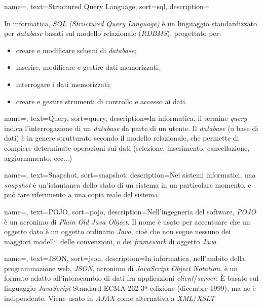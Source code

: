{
    name=,
    text=Structured Query Language,
    sort=sql,
    description={In informatica, \textit{SQL (Structured Query Language)} è un linguaggio standardizzato per \textit{database} basati sul modello relazionale (\textit{RDBMS}), progettato per:
    \begin{itemize}
    	\item{creare e modificare schemi di \textit{database};}
    	\item{inserire, modificare e gestire dati memorizzati;}
    	\item{interrogare i dati memorizzati;}
    	\item{creare e gestire strumenti di controllo e accesso ai dati.}
    \end{itemize}
    }
}

{
    name=,
    text=Query,
    sort=query,
    description={In informatica, il termine \textit{query} indica l'interrogazione di un \textit{database} da parte di un utente. Il \textit{database} (o base di dati) è in genere strutturato secondo il modello relazionale, che permette di compiere determinate operazioni sui dati (selezione, inserimento, cancellazione, aggiornamento, ecc...)}
}

{
    name=,
    text=Snapshot,
    sort=snapshot,
    description={Nei sistemi informatici, una \textit{snapshot} è un'istantanea dello stato di un sistema in un particolare momento, e può fare riferimento a una copia reale del sistema}
}

{
    name=,
    text=POJO,
    sort=pojo,
    description={Nell'ingegneria del software, \textit{POJO} è un acronimo di \textit{Plain Old Java Object}. Il nome è usato per accentuare che un oggetto dato è un oggetto ordinario \textit{Java}, cioè che non segue nessuno dei maggiori modelli, delle convenzioni, o dei \textit{\textit{\gls{framework}}} di oggetto \textit{Java}}
}

{
    name=,
    text=JSON,
    sort=json,
    description={In informatica, nell'ambito della programmazione web, \textit{JSON}, acronimo di \textit{JavaScript Object Notation}, è un formato adatto all'interscambio di dati fra applicazioni \textit{client}/\textit{server}.
È basato sul linguaggio \textit{JavaScript} Standard ECMA-262 3ª edizione (dicembre 1999), ma ne è indipendente. Viene usato in \textit{AJAX} come alternativa a \textit{XML}/\textit{XSLT}}
}

